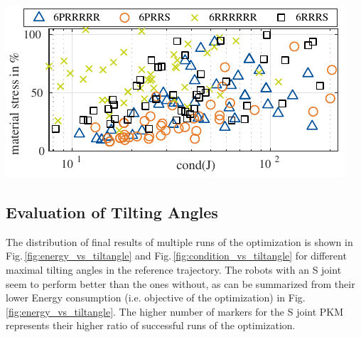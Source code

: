 \documentclass[fleqn,a4paper,10pt]{article}
\renewenvironment{figure}
  {\par\vspace{6pt}\noindent\minipage{\linewidth}}
  {\endminipage\par\vspace{6pt}}
\begin{document}
\begin{multicols}{2}
\begin{figure}
\centering
\includegraphics{./Bilder/figure_matstress_vs_condition.pdf}
\vspace{-0.5cm} %
\label{fig:eval_matstress_vs_condition}
\end{figure}



\subsection{Evaluation of Tilting Angles}
\label{sec:res_condition_pivoting}

The distribution of final results of multiple runs of the optimization is shown in Fig.\,\ref{fig:energy_vs_tiltangle} and Fig.\,\ref{fig:condition_vs_tiltangle} for different maximal tilting angles in the reference trajectory.
The robots with an S joint seem to perform better than the ones without, as can be summarized from their lower Energy consumption (i.e. objective of the optimization) in Fig.\,\ref{fig:energy_vs_tiltangle}.
The higher number of markers for the S joint PKM represents their higher ratio of successful runs of the optimization.



\end{multicols}
\end{document}
